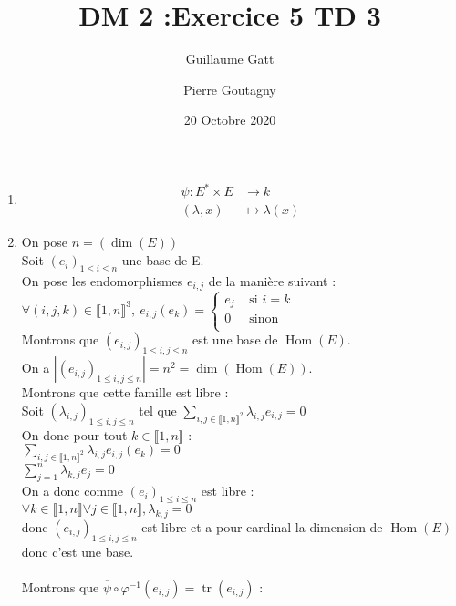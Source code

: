 \documentclass{article}
\title{DM 2 :Exercice 5 TD 3}
\author{Guillaume Gatt \and Pierre Goutagny}
\date{20 Octobre 2020}
\DeclareMathOperator{\tr}{\mathrm{tr}}
\DeclareMathOperator{\Hom}{\mathrm{Hom}}
\begin{document}
\maketitle
\thispagestyle{empty}
\begin{enumerate}[1., start=1]
    \item \begin{align*}
            \psi \colon E^{\ast} \times E &\longrightarrow k \\
                   (\lambda, x) &\longmapsto \lambda(x)
          \end{align*}

    \item
    On pose $n=(\dim(E))$ \\
   Soit $(e_i)_{ 1\leq i \leq n}$ une base de E. \\
   On pose les endomorphismes $e_{i,j}$ de la manière suivant : \\
   $\forall (i,j,k) \in \llbracket 1,n\rrbracket^3,\ e_{i,j}(e_k)=\begin{cases}
       e_j  &\textrm{ si } i=k \\
       0    &\textrm{ sinon} \\
   \end{cases}$ \\
   Montrons que $(e_{i,j})_{ 1\leq i,j \leq n}$ est une base de $\Hom(E)$. \\
   On a $|(e_{i,j})_{ 1\leq i,j \leq n}|=n^2=\dim(\Hom(E))$. \\
   Montrons que cette famille est libre : \\
   Soit $(\lambda_{i,j})_{1 \leq i,j \leq n}$ tel que $\sum_{i,j \in \llbracket 1 , n \rrbracket^2} \lambda_{i,j} e_{i,j} =0$ \\
   On donc pour tout $k \in \llbracket1,n\rrbracket$ : \\
   $\sum_{i,j \in \llbracket 1 , n \rrbracket^2} \lambda_{i,j} e_{i,j}(e_k) =0$ \\
   $\sum_{j=1}^{n} \lambda_{k,j} e_j =0$ \\
   On a donc comme $(e_i)_{ 1\leq i \leq n}$ est libre : \\
   $\forall k \in \llbracket1,n\rrbracket \forall j \in \llbracket 1,n \rrbracket, \lambda_{k,j}=0$ \\
   donc $(e_{i,j})_{ 1\leq i,j \leq n}$ est libre et a pour cardinal la dimension de $\Hom(E)$ donc c'est une base. \\ \\
   Montrons que $\overline{\psi} \circ \varphi^{-1}(e_{i,j})=\tr(e_{i,j})$ : \\

\end{enumerate}
\end{document}
